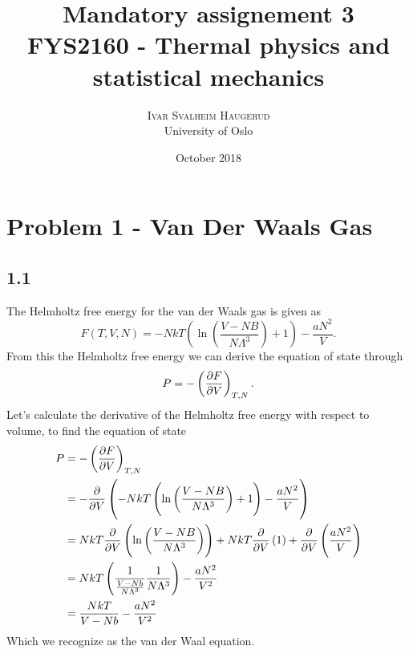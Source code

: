 \documentclass[a4paper,10pt, english]{article}
\title{Mandatory assignement 3\\
FYS2160 - Thermal physics and statistical mechanics}
\author{\textsc{Ivar Svalheim Haugerud}\\University of Oslo}
\date{October 2018}
\begin{document}
\maketitle

\section*{Problem 1 - Van Der Waals Gas}
\subsection*{1.1}
The Helmholtz free energy for the van der Waals gas is given as
\begin{equation}
    F(T, V, N) = -NkT\left(\ln{\left(\frac{V-NB}{N\Lambda^3}\right)}+1\right)-\frac{aN^2}{V}.
\end{equation}
From this the Helmholtz free energy we can derive the equation of state through
\begin{equation}
    P =-\left(\pdv{F}{V}\right)_{T,N}.
\end{equation}
Let's calculate the derivative of the Helmholtz free energy with respect to volume, to find the equation of state
\begin{align*}
    P &= -\left(\pdv{F}{V}\right)_{T,N} \\
      &= -\pdv{}{V}\left(-NkT\left(\ln{\left(\frac{V-NB}{N\Lambda^3}\right)}+1\right)-\frac{aN^2}{V}\right) \\
      &= NkT\pdv{}{V}\left(\ln{\left(\frac{V-NB}{N\Lambda^3}\right)}\right) + NkT\pdv{}{V}\left(1\right) + \pdv{}{V}\left(\frac{aN^2}{V}\right) \\
      &= NkT\left(\frac{1}{\frac{V-Nb}{N\Lambda^3}}\frac{1}{N\Lambda^3}\right) - \frac{aN^2}{V^2} \\
      &= \frac{NkT}{V-Nb} - \frac{aN^2}{V^2}
\end{align*}
Which we recognize as the van der Waal equation.
\end{document}
